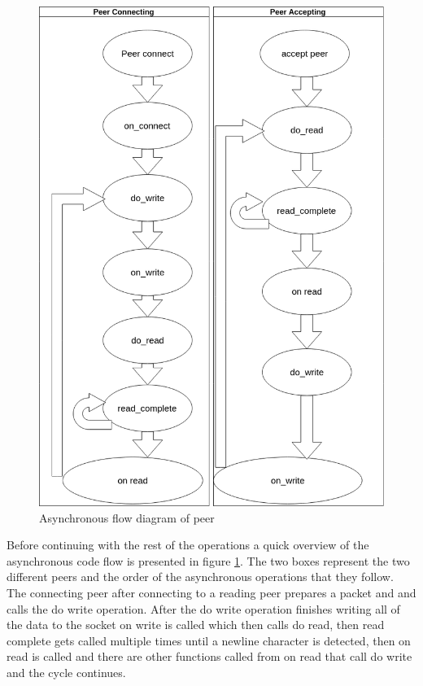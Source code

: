 \begin{figure}[!h]
	\centering
	\includegraphics[width=1\textwidth]{Figures/sync_code_flow-modded.png}
	\caption[Asynchronous flow diagram of peer]{Asynchronous flow diagram of peer}
	\label{fig:s1}
\end{figure}
\FloatBarrier

Before continuing with the rest of the operations a quick overview of the asynchronous code flow is presented in figure \ref{fig:s1}. The two boxes represent the two different peers and the order of the asynchronous operations that they follow. 
The connecting peer after connecting to a reading peer prepares a packet and and calls the do write operation. After the do write operation finishes writing all of the data to the socket on write is called which then calls do read, then read complete gets called multiple times until a newline character is detected, then on read is called and there are other functions called from on read that call do write and the cycle continues.

